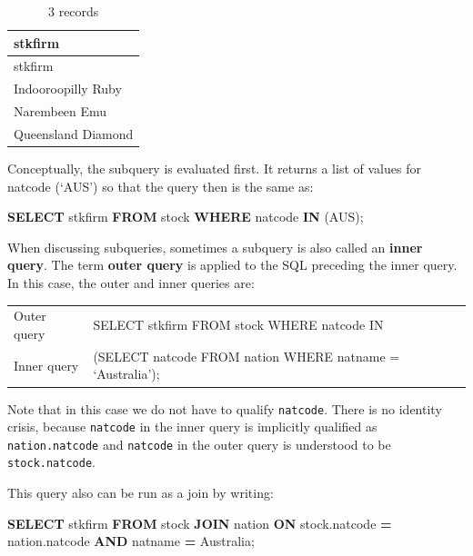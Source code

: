 \documentclass[
]{article}
\newenvironment{Shaded}{\begin{snugshade}}{\end{snugshade}}
\newcommand{\KeywordTok}[1]{\textcolor[rgb]{0.13,0.29,0.53}{\textbf{#1}}}
\newcommand{\NormalTok}[1]{#1}
\newcommand{\OperatorTok}[1]{\textcolor[rgb]{0.81,0.36,0.00}{\textbf{#1}}}
\newcommand{\StringTok}[1]{\textcolor[rgb]{0.31,0.60,0.02}{#1}}
\begin{document}
\begin{longtable}[]{@{}l@{}}
\caption{3 records}\tabularnewline
\toprule()
stkfirm \\
\midrule()
\endfirsthead
\toprule()
stkfirm \\
\midrule()
\endhead
Indooroopilly Ruby \\
Narembeen Emu \\
Queensland Diamond \\
\bottomrule()
\end{longtable}

Conceptually, the subquery is evaluated first. It returns a list of
values for natcode (`AUS') so that the query then is the same as:

\begin{Shaded}
\begin{Highlighting}[]
\KeywordTok{SELECT}\NormalTok{ stkfirm }\KeywordTok{FROM}\NormalTok{ stock}
    \KeywordTok{WHERE}\NormalTok{ natcode }\KeywordTok{IN}\NormalTok{ (}\StringTok{\textquotesingle{}AUS\textquotesingle{}}\NormalTok{);}
\end{Highlighting}
\end{Shaded}

When discussing subqueries, sometimes a subquery is also called an
\textbf{inner query}. The term \textbf{outer query} is applied to the
SQL preceding the inner query. In this case, the outer and inner queries
are:

\begin{longtable}[]{@{}
  >{\raggedright\arraybackslash}p{}
  >{\raggedright\arraybackslash}p{}@{}}
\toprule()
\endhead
Outer query & SELECT stkfirm FROM stock WHERE natcode IN \\
Inner query & (SELECT natcode FROM nation WHERE natname =
`Australia'); \\
\bottomrule()
\end{longtable}

Note that in this case we do not have to qualify \texttt{natcode}. There
is no identity crisis, because \texttt{natcode} in the inner query is
implicitly qualified as \texttt{nation.natcode} and \texttt{natcode} in
the outer query is understood to be \texttt{stock.natcode}.

This query also can be run as a join by writing:

\begin{Shaded}
\begin{Highlighting}[]
\KeywordTok{SELECT}\NormalTok{ stkfirm }\KeywordTok{FROM}\NormalTok{ stock }\KeywordTok{JOIN}\NormalTok{ nation}
    \KeywordTok{ON}\NormalTok{ stock.natcode }\OperatorTok{=}\NormalTok{ nation.natcode}
    \KeywordTok{AND}\NormalTok{ natname }\OperatorTok{=} \StringTok{\textquotesingle{}Australia\textquotesingle{}}\NormalTok{;}
\end{Highlighting}
\end{Shaded}
\end{document}
